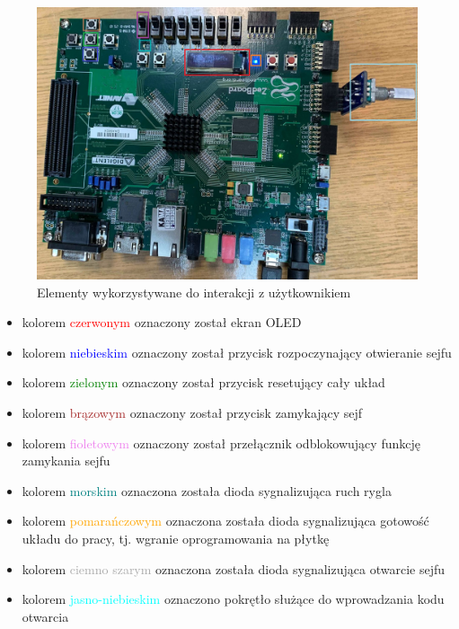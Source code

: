 \documentclass[12pt] {article}
\begin{document}
\begin{figure}[H]
\centering
\includegraphics[width=1.0\textwidth]{res/user_doc/ui.png}
\caption{Elementy wykorzystywane do interakcji z użytkownikiem} 
\end{figure}

\begin{itemize}
\item kolorem \textcolor{red}{czerwonym} oznaczony został ekran OLED
\item kolorem \textcolor{blue}{niebieskim} oznaczony został przycisk rozpoczynający otwieranie sejfu
\item kolorem \textcolor{green}{zielonym} oznaczony został przycisk resetujący cały układ
\item kolorem \textcolor{brown}{brązowym} oznaczony został przycisk zamykający sejf
\item kolorem \textcolor{violet}{fioletowym} oznaczony został przełącznik odblokowujący funkcję zamykania sejfu
\item kolorem \textcolor{teal}{morskim} oznaczona została dioda sygnalizująca ruch rygla
\item kolorem \textcolor{orange}{pomarańczowym} oznaczona została dioda sygnalizująca gotowość układu do pracy, tj. wgranie oprogramowania na płytkę
\item kolorem \textcolor{darkgray}{ciemno szarym} oznaczona została dioda sygnalizująca otwarcie sejfu
\item kolorem \textcolor{cyan}{jasno-niebieskim} oznaczono pokrętło służące do wprowadzania kodu otwarcia
\end{itemize}

\newpage
\end{document}

